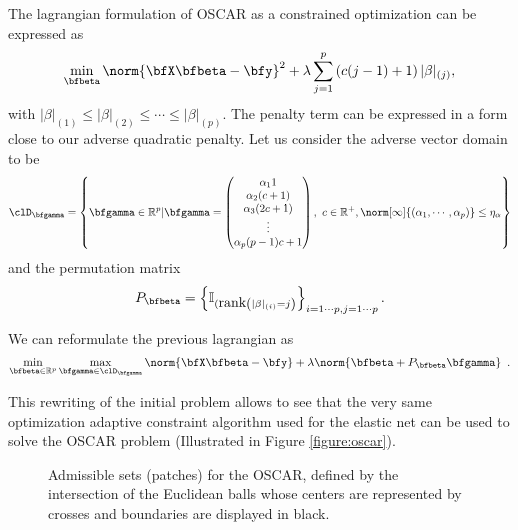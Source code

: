 The lagrangian formulation of  OSCAR as a constrained optimization can be expressed as
$$
 \min_{\bfbeta}     \norm{\bfX  \bfbeta  - \bfy  }^2+\lambda \sum_{j=1}^p \left( c(j-1)+1 \right) |\beta|_{(j)},
$$
with $|\beta|_{(1)}\leq |\beta|_{(2)} \leq \cdots \leq |\beta|_{(p)}$. The penalty term can be expressed in a form close to our adverse quadratic penalty. Let us consider  the adverse vector domain to be
$$
 \clD_{\bfgamma}=\left\{ \bfgamma \in \mathbb{R}^p | \bfgamma= 
\begin{pmatrix}
\alpha_1 1\\
\alpha_2 (c+1) \\
\alpha_3 (2c+1) \\
\vdots \\
\alpha_p (p-1) c+1
\end{pmatrix}, \ c\in \mathbb{R}^+ , 
\norm[\infty]{(\alpha_1,\cdots,\alpha_p)} \leq \eta_\alpha \right\}
$$
and the permutation matrix
$$
 P_{\bfbeta} = \left\{ \mathbb{I}_{(\mbox{rank}\left( |\beta|_{(i)}=j \right)} \right\}_{i = 1 \cdots p, j=1 \cdots p}.
$$

We can reformulate the previous lagrangian as 
\begin{equation*}
    \min_{\bfbeta\in\mathbb{R}^p} \max_{\bfgamma \in \clD_{\bfgamma}}
    \norm{\bfX \bfbeta - \bfy } + \lambda \norm{\bfbeta +
     P_{\bfbeta}  \bfgamma } \enspace.
\end{equation*}

This rewriting of the initial problem  allows to see that the very same
optimization adaptive  constraint algorithm  used for the  elastic net
can be used to solve the OSCAR problem (Illustrated in Figure \ref{figure:oscar}).


\begin{figure}
  \begin{center} 
    \caption{Admissible sets (patches) for the OSCAR, defined by the
      intersection of the Euclidean balls whose centers are represented by
      crosses and boundaries are
      displayed in black.} \label{figure:oscar}
    \label{fig:oscar-penalty}
    \end{center} 
\end{figure}

